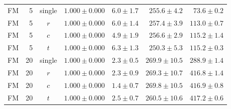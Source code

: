 \begin{table}[htpb]
\begin{tabularx}{\linewidth}{@{}L r c rrrr@{}}
    \addlinespace[2pt]
    FM & 5 & single & $1.000 \pm 0.000$ & $6.0 \pm 1.7$ & $255.6 \pm 4.2$ & $73.6 \pm 0.2$ \\
    FM & 5 & $r$ & $1.000 \pm 0.000$ & $6.0 \pm 1.4$ & $257.4 \pm 3.9$ & $113.0 \pm 0.7$ \\
    FM & 5 & $c$ & $1.000 \pm 0.000$ & $4.9 \pm 1.9$ & $256.6 \pm 2.9$ & $115.2 \pm 1.4$ \\
    FM & 5 & $t$ & $1.000 \pm 0.000$ & $6.3 \pm 1.3$ & $250.3 \pm 5.3$ & $115.2 \pm 0.3$ \\
    \addlinespace[2pt]
    FM & 20 & single & $1.000 \pm 0.000$ & $2.3 \pm 0.5$ & $269.9 \pm 10.5$ & $288.9 \pm 1.4$ \\
    FM & 20 & $r$ & $1.000 \pm 0.000$ & $2.3 \pm 0.9$ & $269.3 \pm 10.7$ & $416.8 \pm 1.4$ \\
    FM & 20 & $c$ & $1.000 \pm 0.000$ & $1.4 \pm 0.7$ & $269.8 \pm 10.5$ & $416.9 \pm 0.8$ \\
    FM & 20 & $t$ & $1.000 \pm 0.000$ & $2.5 \pm 0.7$ & $260.5 \pm 10.6$ & $417.2 \pm 0.6$ \\
    \bottomrule
  \end{tabularx}
\end{table}


